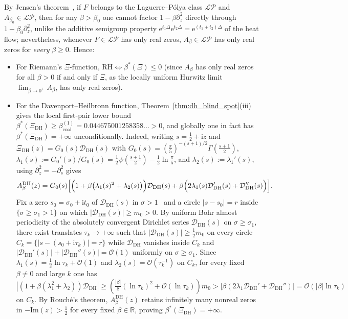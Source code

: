 \documentclass[11pt,reqno]{amsart}
\theoremstyle{definition}
\theoremstyle{remark}
\numberwithin{equation}{section}
\newcommand{\R}{\mathbb{R}}
\newcommand{\ee}{\mathrm{e}}
\newcommand{\ii}{\mathrm{i}}
\newcommand{\Ima}{\mathrm{Im}}
\begin{document}
By Jensen's theorem~\cite{jensen1913}, if $F$ belongs to the Laguerre--P\'olya class $\mathcal{LP}$ and $A_{\beta_0} \in \mathcal{LP}$, then for any $\beta > \beta_0$ one cannot factor $1 - \beta\partial_z^2$ directly through $1 - \beta_0\partial_z^2$, unlike the additive semigroup property $\ee^{t_1\Delta}\ee^{t_2\Delta} = \ee^{(t_1+t_2)\Delta}$ of the heat flow; nevertheless, whenever $F \in \mathcal{LP}$ has only real zeros, $A_\beta \in \mathcal{LP}$ has only real zeros for \emph{every} $\beta \ge 0$. Hence:
\begin{itemize}[leftmargin=1.8em]
\item For Riemann's $\Xi$-function, $\text{RH} \iff \beta^*(\Xi) \le 0$ (since $A_\beta$ has only real zeros for all $\beta > 0$ if and only if $\Xi$, as the locally uniform Hurwitz limit $\lim_{\beta \to 0^+} A_\beta$, has only real zeros).
\item For the Davenport--Heilbronn function, Theorem~\ref{thm:dh_blind_spot}(iii) gives the local first-pair lower bound $\beta^*(\Xi_{\mathrm{DH}}) \ge \beta_{\mathrm{coal}}^{(1)} = 0.044675001258358\ldots > 0$, and globally one in fact has $\beta^*(\Xi_{\mathrm{DH}}) = +\infty$ unconditionally. Indeed, writing $s = \frac{1}{2} + \ii z$ and $\Xi_{\mathrm{DH}}(z) = G_0(s)\mathcal{D}_{\mathrm{DH}}(s)$ with $G_0(s) = (\frac{\pi}{5})^{-(s+1)/2}\Gamma(\frac{s+1}{2})$, $\lambda_1(s) := G_0'(s)/G_0(s) = \frac{1}{2}\psi(\frac{s+1}{2}) - \frac{1}{2}\ln\frac{\pi}{5}$, and $\lambda_2(s) := \lambda_1'(s)$, using $\partial_z^2 = -\partial_s^2$ gives
\[
A_\beta^{\mathrm{DH}}(z) = G_0(s)\Bigl[\Bigl(1 + \beta\bigl(\lambda_1(s)^2 + \lambda_2(s)\bigr)\Bigr)\mathcal{D}_{\mathrm{DH}}(s) + \beta\Bigl(2\lambda_1(s)\mathcal{D}_{\mathrm{DH}}'(s) + \mathcal{D}_{\mathrm{DH}}''(s)\Bigr)\Bigr].
\]
Fix a zero $s_0 = \sigma_0 + \ii t_0$ of $\mathcal{D}_{\mathrm{DH}}(s)$ in $\sigma > 1$~\cite{davenportheilbronn1936} and a circle $|s - s_0| = r$ inside $\{\sigma \ge \sigma_1 > 1\}$ on which $|\mathcal{D}_{\mathrm{DH}}(s)| \ge m_0 > 0$. By uniform Bohr almost periodicity of the absolutely convergent Dirichlet series $\mathcal{D}_{\mathrm{DH}}(s)$ on $\sigma \ge \sigma_1$, there exist translates $\tau_k \to +\infty$ such that $|\mathcal{D}_{\mathrm{DH}}(s)| \ge \frac{1}{2}m_0$ on every circle $C_k = \{|s - (s_0 + \ii\tau_k)| = r\}$ while $\mathcal{D}_{\mathrm{DH}}$ vanishes inside $C_k$ and $|\mathcal{D}_{\mathrm{DH}}'(s)| + |\mathcal{D}_{\mathrm{DH}}''(s)| = \mathcal{O}(1)$ uniformly on $\sigma \ge \sigma_1$. Since $\lambda_1(s) = \frac{1}{2}\ln\tau_k + \mathcal{O}(1)$ and $\lambda_2(s) = \mathcal{O}(\tau_k^{-1})$ on $C_k$, for every fixed $\beta \neq 0$ and large $k$ one has $|(1 + \beta(\lambda_1^2 + \lambda_2))\mathcal{D}_{\mathrm{DH}}| \ge (\frac{|\beta|}{8}(\ln\tau_k)^2 + \mathcal{O}(\ln\tau_k))m_0 > |\beta(2\lambda_1\mathcal{D}_{\mathrm{DH}}' + \mathcal{D}_{\mathrm{DH}}'')| = \mathcal{O}(|\beta|\ln\tau_k)$ on $C_k$. By Rouch\'e's theorem, $A_\beta^{\mathrm{DH}}(z)$ retains infinitely many nonreal zeros in $-\Ima(z) > \frac{1}{2}$ for every fixed $\beta \in \R$, proving $\beta^*(\Xi_{\mathrm{DH}}) = +\infty$.
\end{itemize}
\end{document}
